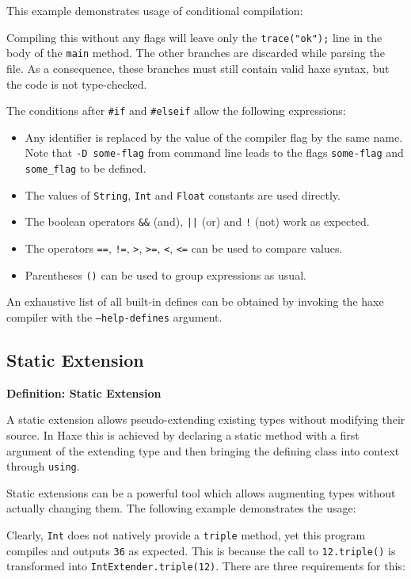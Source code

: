 \documentclass{article}
\newcommand{\type}[1]{\texttt{#1}}
\newcommand{\expr}[1]{\texttt{#1}}
\newenvironment{myshaded}
  {\def\FrameCommand{\fboxsep=\topsep\colorbox{bgcolor}}%
  \MakeFramed {\advance\hsize-\width \FrameRestore}}%
 {\endMakeFramed}
\newcommand{\define}[3][Definition]
	{\begin{myshaded}\noindent\textbf{#1: #2}\par\nobreak\noindent\ignorespaces#3\label{def:#2}\end{myshaded}}
\begin{document}
This example demonstrates usage of conditional compilation:


Compiling this without any flags will leave only the \expr{trace("ok");} line in the body of the \expr{main} method. The other branches are discarded while parsing the file. As a consequence, these branches must still contain valid haxe syntax, but the code is not type-checked.

The conditions after \expr{\#if} and \expr{\#elseif} allow the following expressions:

\begin{itemize}
	\item Any identifier is replaced by the value of the compiler flag by the same name. Note that \expr{-D some-flag} from command line leads to the flags \expr{some-flag} and \expr{some\_flag} to be defined.
	\item The values of \type{String}, \type{Int} and \type{Float} constants are used directly.
	\item The boolean operators \expr{\&\&} (and), \expr{||} (or) and \expr{!} (not) work as expected.
	\item The operators \expr{==}, \expr{!=}, \expr{>}, \expr{>=}, \expr{<}, \expr{<=} can be used to compare values.
	\item Parentheses \expr{()} can be used to group expressions as usual.
\end{itemize}
An exhaustive list of all built-in defines can be obtained by invoking the haxe compiler with the \expr{--help-defines} argument.


\subsection{Static Extension}
\label{Static Extension}

\define{Static Extension}{A static extension allows pseudo-extending existing types without modifying their source. In Haxe this is achieved by declaring a static method with a first argument of the extending type and then bringing the defining class into context through \expr{using}.}

Static extensions can be a powerful tool which allows augmenting types without actually changing them. The following example demonstrates the usage:



Clearly, \type{Int} does not natively provide a \expr{triple} method, yet this program compiles and outputs \expr{36} as expected. This is because the call to \expr{12.triple()} is transformed into \expr{IntExtender.triple(12)}. There are three requirements for this:
\end{document}
